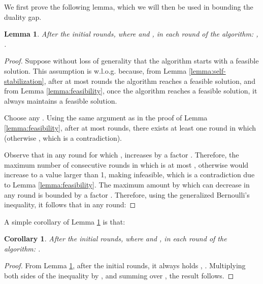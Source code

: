 \documentclass[11pt]{article}
\newtheorem{lemma}[theorem]{Lemma}
\newtheorem{corollary}[theorem]{Corollary}
\begin{document}
We first prove the following lemma, which we will then be used in bounding the duality gap.
\begin{lemma}\label{lemma:alpha<1-lower-bound-xi-j}
After the initial  rounds, where  and , in each round of the algorithm: , .
\end{lemma}
\begin{proof}
Suppose without loss of generality that the algorithm starts with a feasible solution. This assumption is w.l.o.g. because, from Lemma \ref{lemma:self-stabilization}, after at most  rounds the algorithm reaches a feasible solution, and from Lemma \ref{lemma:feasibility}, once the algorithm reaches a feasible solution, it always maintains a feasible solution. 

Choose any . Using the same argument as in the proof of Lemma \ref{lemma:feasibility}, after at most  rounds, there exists at least one round in which  (otherwise , which is a contradiction).

Observe that in any round for which ,  increases by a factor . Therefore, the maximum number of consecutive rounds in which  is at most , otherwise  would increase to a value larger than 1, making  infeasible, which is a contradiction due to Lemma \ref{lemma:feasibility}. The maximum amount by which  can decrease in any round is bounded by a factor . Therefore, using the generalized Bernoulli's inequality, it follows that in any round:

\end{proof}
A simple corollary of Lemma \ref{lemma:alpha<1-lower-bound-xi-j} is that:
\begin{corollary}\label{cor:alpha<1-lower-comp}
After the initial  rounds, where  and , in each round of the algorithm: .
\end{corollary}
\begin{proof}
From Lemma \ref{lemma:alpha<1-lower-bound-xi-j}, after the initial  rounds, it always holds , . Multiplying both sides of the inequality by ,  and summing over , the result follows.
\end{proof}
\end{document}
